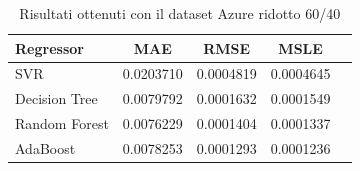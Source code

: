 \begin{table}[H]
    \centering
    \begin{tabular}{|>{\centering\arraybackslash}m{5cm}|c|c|c|c|}
        \hline
        \textbf{Regressor} & \textbf{MAE} & \textbf{RMSE} & \textbf{MSLE} \\ [10pt]
        \hline
        SVR & 0.0203710 & 0.0004819 & 0.0004645 \\ [10pt]
        \hline
        Decision Tree & 0.0079792 & 0.0001632 & 0.0001549 \\ [10pt]
        \hline
        Random Forest & 0.0076229 & 0.0001404 & 0.0001337 \\ [10pt]
        \hline
        AdaBoost & 0.0078253 & 0.0001293 & 0.0001236 \\ [10pt]
        \hline
    \end{tabular}
    \caption{Risultati ottenuti con il dataset Azure ridotto 60/40}
    \label{tab:results}
\end{table}

